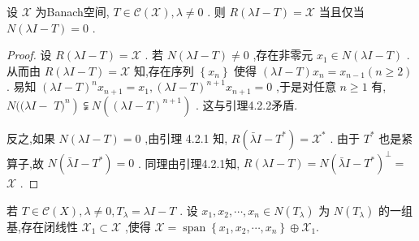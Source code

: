\documentclass[lang=cn,newtx,10pt,scheme=chinese,thmcnt=chapter]{elegantbook}
\begin{document}
\begin{lemma}
    设 \(\mathcal{X}\) 为Banach空间, \(T \in  \mathcal{C}\left( \mathcal{X}\right) ,\lambda  \neq  0\) . 则 \(R\left( {{\lambda I} - T}\right)  = \mathcal{X}\) 当且仅当 \(N\left( {{\lambda I} - T}\right)  = 0\) .
\end{lemma}
\begin{proof}
     设 \(R\left( {{\lambda I} - T}\right)  = \mathcal{X}\) . 若 \(N\left( {{\lambda I} - T}\right)  \neq  0\) ,存在非零元 \({x}_{1} \in  N\left( {{\lambda I} - T}\right)\) . 从而由 \(R\left( {{\lambda I} - T}\right)  = \mathcal{X}\) 知,存在序列 \(\left\{  {x}_{n}\right\}\) 使得 \(\left( {{\lambda I} - T}\right) {x}_{n} = {x}_{n - 1}\left( {n \geq  2}\right)\) . 易知 \({\left( \lambda I - T\right) }^{n}{x}_{n + 1} = {x}_{1},{\left( \lambda I - T\right) }^{n + 1}{x}_{n + 1} = 0\) ,于是对任意 \(n \geq  1\) 有, \(N(({\lambda I} -\)  \(\left. {T{)}^{n}}\right)  \subsetneqq  N\left( {\left( \lambda I - T\right) }^{n + 1}\right)\) . 这与引理4.2.2矛盾.

反之,如果 \(N\left( {{\lambda I} - T}\right)  = 0\) ,由引理 4.2.1 知, \(R\left( {\bar{\lambda }I - {T}^{ * }}\right)  = {\mathcal{X}}^{ * }\) . 由于 \({T}^{ * }\) 也是紧算子,故 \(N\left( {\bar{\lambda }I - {T}^{ * }}\right)  = 0\) . 同理由引理4.2.1知, \(R\left( {{\lambda I} - T}\right)  = N{\left( \bar{\lambda }I - {T}^{ * }\right) }^{ \bot  } =\)  \(\mathcal{X}\) .

\end{proof}

\begin{lemma}
 若 \(T \in  \mathcal{C}\left( X\right) ,\lambda  \neq  0,{T}_{\lambda } = {\lambda I} - T\) . 设 \( {x}_{1},{x}_{2},\cdots ,{x}_{n} \in  N\left(T_\lambda\right) \) 为 \( N\left(T_\lambda\right) \) 的一组基,存在闭线性 \( {\mathcal{X}}_{1} \subset  \mathcal{X} \) ,使得
\( \mathcal{X} = \operatorname{span}\left\{  {{x}_{1},{x}_{2},\cdots ,{x}_{n}}\right\}   \oplus  {\mathcal{X}}_{1}. \)
\end{lemma}
\end{document}
